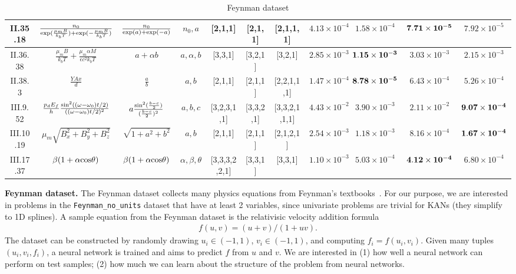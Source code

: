 \documentclass{article}
\numberwithin{equation}{section}
\numberwithin{figure}{section}
\begin{document}
\begin{table}[t]
{\begin{tabular}{|c|c|c|c|c|c|c|c|c|c|c|}
    II.35.18 & $\frac{n_0}{{\rm exp}(\frac{\mu_m B}{k_b T})+{\rm exp}(-\frac{\mu_m B}{k_b T})}$ & $\frac{n_0}{{\rm exp}(a)+{\rm exp}(-a)}$ & $n_0,a$ & [2,1,1]  & [2,1,1] & [2,1,1,1] & $4.13\times 10^{-4}$ & $1.58\times 10^{-4}$ & ${\bf 7.71\times 10^{-5}}$ & $7.92\times 10^{-5}$ \\\hline
    II.36.38 & $\frac{\mu_m B}{k_b T}+\frac{\mu_m\alpha M}{\epsilon c^2k_bT}$ & $a+\alpha b$ & $a,\alpha,b$ & [3,3,1]  & [3,2,1] & [3,2,1] & $2.85\times 10^{-3}$ & ${\bf 1.15\times 10^{-3}}$ & $3.03\times 10^{-3}$ & $2.15\times 10^{-3}$ \\\hline
    II.38.3 & $\frac{YAx}{d}$ & $\frac{a}{b}$ & $a,b$ & [2,1,1]  & [2,1,1] & [2,2,1,1,1] & $1.47\times 10^{-4}$ & ${\bf 8.78\times 10^{-5}}$ & $6.43\times 10^{-4}$ & $5.26\times 10^{-4}$ \\\hline
    III.9.52 & $\frac{p_dE_f}{h}\frac{{\rm sin}^2((\omega-\omega_0)t/2)}{((\omega-\omega_0)t/2)^2}$ & $a\frac{{\rm sin}^2(\frac{b-c}{2})}{(\frac{b-c}{2})^2}$ & $a,b,c$ &  [3,2,3,1,1]  & [3,3,2,1] & [3,3,2,1,1,1] & $4.43\times 10^{-2}$ & $3.90\times 10^{-3}$ & $2.11\times 10^{-2}$ & ${\bf 9.07\times 10^{-4}}$ \\\hline
    III.10.19 & $\mu_m\sqrt{B_x^2+B_y^2+B_z^2}$ & $\sqrt{1+a^2+b^2}$ & $a,b$ & [2,1,1] & [2,1,1] & [2,1,2,1] & $2.54\times 10^{-3}$ & $1.18\times 10^{-3}$ & $8.16\times 10^{-4}$ & ${\bf 1.67\times 10^{-4}}$ \\\hline
    III.17.37 & $\beta(1+\alpha{\rm cos}\theta)$ & $\beta(1+\alpha{\rm cos}\theta)$ &  $\alpha,\beta,\theta$ &  [3,3,3,2,2,1] & [3,3,1] & [3,3,1] & $1.10\times 10^{-3}$ & $5.03\times 10^{-4}$ & ${\bf 4.12\times 10^{-4}}$ & $6.80\times 10^{-4}$ \\\hline
    \end{tabular}}
    \vspace{2mm}
    \caption{Feynman dataset}
    \label{tab:feynman_kan_shape}
\end{table}

{\bf Feynman dataset.} The Feynman dataset collects many physics equations from Feynman's textbooks~\cite{udrescu2020ai,udrescu2020ai2}. For our purpose, we are interested in problems in the \texttt{Feynman\_no\_units} dataset that have at least 2 variables, since univariate problems are trivial for KANs (they simplify to 1D splines). A sample equation from the Feynman dataset is the relativisic velocity addition formula
\begin{align}
    f(u,v) = (u+v)/(1+uv).
\end{align}
The dataset can be constructed by randomly drawing $u_i\in (-1,1)$, $v_i\in (-1,1)$, and computing $f_i=f(u_i,v_i)$. Given many tuples $(u_i,v_i,f_i)$, a neural network is trained and aims to predict $f$ from $u$ and $v$. We are interested in (1) how well a neural network can perform on test samples; (2) how much we can learn about the structure of the problem from neural networks.
\end{document}
